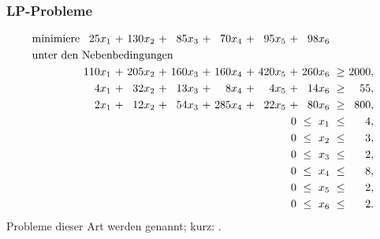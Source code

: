 \documentclass[smaller]{beamer}
\begin{document}
\begin{frame}
 \frametitle{LP-Probleme}
 \begin{align*}
\begin{alignedat}{8}
& \text{minimiere } & 25x_1 &\ + &\ 130x_2 &\ + &\ 85x_3 &\ + &\ 70x_4 &\ + &\ 95x_5 &\ + &\ 98x_6 & & \\
& \rlap{unter den Nebenbedingungen} & & & & & & & & & & & & & \\
&& 110x_1 &\ + &\ 205x_2 &\ + &\ 160x_3 &\ + &\ 160x_4 &\ + &\ 420x_5 &\ + &\ 260x_6 &\ \geq &\  2000,\ \\
&&   4x_1 &\ + &\ 32x_2 &\ + &\ 13x_3 &\ + &\ 8x_4 &\ + &\ 4x_5 &\ + &\ 14x_6 &\ \geq &\  55,\ \\
&&   2x_1 &\ + &\ 12x_2 &\ + &\ 54x_3 &\ + &\ 285x_4 &\ + &\ 22x_5 &\ + &\ 80x_6 &\ \geq &\  800,\ \\
&& & & & & & & & & & & \llap{$0\ \leq\ x_1$} &\ \leq &\ 4,\ \\
&& & & & & & & & & & & \llap{$0\ \leq\ x_2$} &\ \leq &\ 3,\ \\
&& & & & & & & & & & & \llap{$0\ \leq\ x_3$} &\ \leq &\ 2,\ \\
&& & & & & & & & & & & \llap{$0\ \leq\ x_4$} &\ \leq &\ 8,\ \\
&& & & & & & & & & & & \llap{$0\ \leq\ x_5$} &\ \leq &\ 2,\ \\
&& & & & & & & & & & & \llap{$0\ \leq\ x_6$} &\ \leq &\ 2.\ 
\end{alignedat}
\end{align*}
Probleme dieser Art werden  genannt; kurz: . 
\end{frame}
\end{document}
